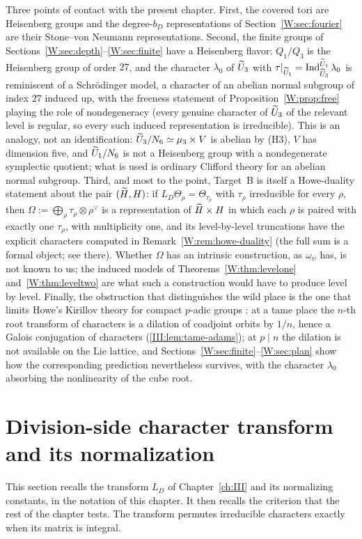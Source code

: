 Three points of contact with the present chapter.  First, the covered
tori are Heisenberg groups and the degree-$b_D$ representations of
Section~\ref{W:sec:fourier} are their Stone--von Neumann representations.
Second, the finite groups of Sections~\ref{W:sec:depth}--\ref{W:sec:finite}
have a Heisenberg flavor: $Q_1/Q_3$ is the Heisenberg group of order
$27$, and the character $\lambda_0$ of $\widetilde U_3$ with
$\tau|_{\widetilde U_1}=\operatorname{Ind}_{\widetilde U_3}^{\widetilde U_1}\lambda_0$ is reminiscent of a
Schr\"odinger model, a character of an abelian normal subgroup of index
$27$ induced up, with the freeness statement of
Proposition~\ref{W:prop:free} playing the role of nondegeneracy (every
genuine character of $\widetilde U_3$ of the relevant level is regular, so every
such induced representation is irreducible).  This is an analogy, not an
identification: $\widetilde U_3/N_6\simeq\mu_3\times V$ is abelian by (H3), $V$
has dimension five, and $\widetilde U_1/N_6$ is not a Heisenberg group with a
nondegenerate symplectic quotient; what is used is ordinary Clifford
theory for an abelian normal subgroup.  Third, and most
to the point, Target~B is itself a Howe-duality statement about the pair
$(\widetilde H,H)$: if $L_D\Theta_\rho=\Theta_{\tau_\rho}$ with $\tau_\rho$
irreducible for every $\rho$, then $\Omega:=\bigoplus_\rho\tau_\rho\otimes\rho^\vee$
is a representation of $\widetilde H\times H$ in which each $\rho$ is paired
with exactly one $\tau_\rho$, with multiplicity one, and its
level-by-level truncations have the explicit characters computed in
Remark~\ref{W:rem:howe-duality} (the full sum is a formal object; see
there).
Whether $\Omega$ has an intrinsic construction, as $\omega_\psi$ has,
is not known to us; the induced models of
Theorems~\ref{W:thm:levelone} and~\ref{W:thm:leveltwo} are what such a
construction would have to produce level by level.  Finally, the
obstruction that distinguishes the wild place is the one that limits
Howe's Kirillov theory for compact $p$-adic groups \cite{How77a}: at a tame
place the $n$-th root transform of characters is a dilation of coadjoint
orbits by $1/n$, hence a Galois conjugation of characters (\cref{III:lem:tame-adams}); at $p\mid n$ the dilation is not available on the Lie
lattice, and Sections~\ref{W:sec:finite}--\ref{W:sec:plan} show how the
corresponding prediction nevertheless survives, with the character
$\lambda_0$ absorbing the nonlinearity of the cube root.

\section{Division-side character transform and its normalization}\label{W:sec:transform}
This section recalls the transform $L_D$ of Chapter~\ref{ch:III} and its normalizing constants, in the notation of this chapter. It then recalls the criterion that the rest of the chapter tests. The transform permutes irreducible characters exactly when its matrix is integral.

